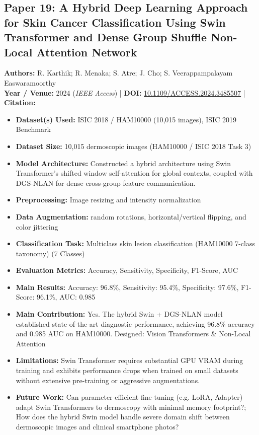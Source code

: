 \documentclass[11pt,a4paper]{article}
\begin{document}
\subsection{Paper 19: A Hybrid Deep Learning Approach for Skin Cancer Classification Using Swin Transformer and Dense Group Shuffle Non-Local Attention Network}
\textbf{Authors:} R. Karthik; R. Menaka; S. Atre; J. Cho; S. Veerappampalayam Easwaramoorthy \\
\textbf{Year / Venue:} 2024 (\textit{IEEE Access}) | \textbf{DOI:} \href{https://doi.org/10.1109/ACCESS.2024.3485507}{10.1109/ACCESS.2024.3485507} | \textbf{Citation:} \cite{10731679}

\begin{itemize}\small
\item \textbf{Dataset(s) Used:} ISIC 2018 / HAM10000 (10,015 images), ISIC 2019 Benchmark
\item \textbf{Dataset Size:} 10,015 dermoscopic images (HAM10000 / ISIC 2018 Task 3)
\item \textbf{Model Architecture:} Constructed a hybrid architecture using Swin Transformer's shifted window self-attention for global contexts, coupled with DGS-NLAN for dense cross-group feature communication.
\item \textbf{Preprocessing:} Image resizing and intensity normalization
\item \textbf{Data Augmentation:} random rotations, horizontal/vertical flipping, and color jittering
\item \textbf{Classification Task:} Multiclass skin lesion classification (HAM10000 7-class taxonomy) (7 Classes)
\item \textbf{Evaluation Metrics:} Accuracy, Sensitivity, Specificity, F1-Score, AUC
\item \textbf{Main Results:} Accuracy: 96.8\%, Sensitivity: 95.4\%, Specificity: 97.6\%, F1-Score: 96.1\%, AUC: 0.985
\item \textbf{Main Contribution:} Yes. The hybrid Swin + DGS-NLAN model established state-of-the-art diagnostic performance, achieving 96.8\% accuracy and 0.985 AUC on HAM10000. Designed: Vision Transformers \& Non-Local Attention
\item \textbf{Limitations:} Swin Transformer requires substantial GPU VRAM during training and exhibits performance drops when trained on small datasets without extensive pre-training or aggressive augmentations.
\item \textbf{Future Work:} Can parameter-efficient fine-tuning (e.g. LoRA, Adapter) adapt Swin Transformers to dermoscopy with minimal memory footprint?; How does the hybrid Swin model handle severe domain shift between dermoscopic images and clinical smartphone photos?

\end{itemize}
\end{document}
